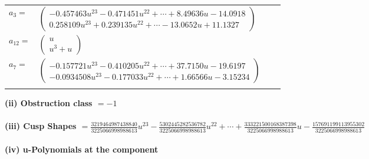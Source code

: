 \documentclass[1p]{elsarticle_modified}
\theoremstyle{definition}
\begin{document}
\begin{tabular}{m{7pt} m{180pt} m{7pt} m{180pt} }
\flushright $a_{3}=$&$\begin{pmatrix}-0.457463 u^{23}-0.471451 u^{22}+\cdots+8.49636 u-14.0918\\0.258109 u^{23}+0.239135 u^{22}+\cdots-13.0652 u+11.1327\end{pmatrix}$ \\
\flushright $a_{12}=$&$\begin{pmatrix}u\\u^3+u\end{pmatrix}$ \\
\flushright $a_{7}=$&$\begin{pmatrix}-0.157721 u^{23}-0.410205 u^{22}+\cdots+37.7150 u-19.6197\\-0.0934508 u^{23}-0.177033 u^{22}+\cdots+1.66566 u-3.15234\end{pmatrix}$\\&\end{tabular}
\flushleft \textbf{(ii) Obstruction class $= -1$}\\~\\
\flushleft \textbf{(iii) Cusp Shapes $= \frac{3219464987438840}{3225066998988613} u^{23}-\frac{5302445282536782}{3225066998988613} u^{22}+\cdots+\frac{333221500168387398}{3225066998988613} u-\frac{157691199113955302}{3225066998988613}$}\\~\\
\newpage\renewcommand{\arraystretch}{1}
\flushleft \textbf{(iv) u-Polynomials at the component}\newline \\
\end{document}
